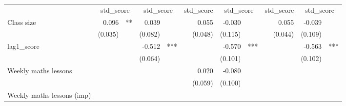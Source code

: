 \documentclass{article}
\begin{document}
\begin{table}[!h]
\centering
\begin{tabular}{lllllllllll}
\cline{1-11}
\multicolumn{1}{r}{} &
  \multicolumn{2}{c}{std\_score} &
  \multicolumn{2}{c}{std\_score} &
  \multicolumn{1}{c}{std\_score} &
  \multicolumn{2}{c}{std\_score} &
  \multicolumn{1}{c}{std\_score} &
  \multicolumn{2}{c}{std\_score} \\
\cline{1-11}
\multicolumn{1}{l}{Class size} &
  \multicolumn{1}{r}{0.096} &
  \multicolumn{1}{l}{**} &
  \multicolumn{1}{r}{0.039} &
  \multicolumn{1}{l}{} &
  \multicolumn{1}{r}{0.055} &
  \multicolumn{1}{r}{-0.030} &
  \multicolumn{1}{l}{} &
  \multicolumn{1}{r}{0.055} &
  \multicolumn{1}{r}{-0.039} &
  \multicolumn{1}{l}{} \\
\multicolumn{1}{l}{} &
  \multicolumn{1}{r}{(0.035)} &
  \multicolumn{1}{l}{} &
  \multicolumn{1}{r}{(0.082)} &
  \multicolumn{1}{l}{} &
  \multicolumn{1}{r}{(0.048)} &
  \multicolumn{1}{r}{(0.115)} &
  \multicolumn{1}{l}{} &
  \multicolumn{1}{r}{(0.044)} &
  \multicolumn{1}{r}{(0.109)} &
  \multicolumn{1}{l}{} \\
\multicolumn{1}{l}{lag1\_score} &
  \multicolumn{1}{r}{} &
  \multicolumn{1}{l}{} &
  \multicolumn{1}{r}{-0.512} &
  \multicolumn{1}{l}{***} &
  \multicolumn{1}{r}{} &
  \multicolumn{1}{r}{-0.570} &
  \multicolumn{1}{l}{***} &
  \multicolumn{1}{r}{} &
  \multicolumn{1}{r}{-0.563} &
  \multicolumn{1}{l}{***} \\
\multicolumn{1}{l}{} &
  \multicolumn{1}{r}{} &
  \multicolumn{1}{l}{} &
  \multicolumn{1}{r}{(0.064)} &
  \multicolumn{1}{l}{} &
  \multicolumn{1}{r}{} &
  \multicolumn{1}{r}{(0.101)} &
  \multicolumn{1}{l}{} &
  \multicolumn{1}{r}{} &
  \multicolumn{1}{r}{(0.102)} &
  \multicolumn{1}{l}{} \\
\multicolumn{1}{l}{Weekly maths lessons} &
  \multicolumn{1}{r}{} &
  \multicolumn{1}{l}{} &
  \multicolumn{1}{r}{} &
  \multicolumn{1}{l}{} &
  \multicolumn{1}{r}{0.020} &
  \multicolumn{1}{r}{-0.080} &
  \multicolumn{1}{l}{} &
  \multicolumn{1}{r}{} &
  \multicolumn{1}{r}{} &
  \multicolumn{1}{l}{} \\
\multicolumn{1}{l}{} &
  \multicolumn{1}{r}{} &
  \multicolumn{1}{l}{} &
  \multicolumn{1}{r}{} &
  \multicolumn{1}{l}{} &
  \multicolumn{1}{r}{(0.059)} &
  \multicolumn{1}{r}{(0.100)} &
  \multicolumn{1}{l}{} &
  \multicolumn{1}{r}{} &
  \multicolumn{1}{r}{} &
  \multicolumn{1}{l}{} \\
\multicolumn{1}{l}{Weekly maths lessons (imp)} &
  \multicolumn{1}{r}{} &
  \multicolumn{1}{l}{} &

\end{tabular}
\end{table}
\end{document}
